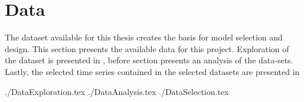 \chapter{Data}
\label{section:Data}




The dataset available for this thesis creates the basis for model selection and design.
This section presents the available data for this project.
Exploration of the dataset is presented in ,
before section  presents an analysis of the data-sets.
Lastly, the selected time series contained in the selected datasets are presented in 

{./DataExploration.tex}
{./DataAnalysis.tex}
{./DataSelection.tex}
